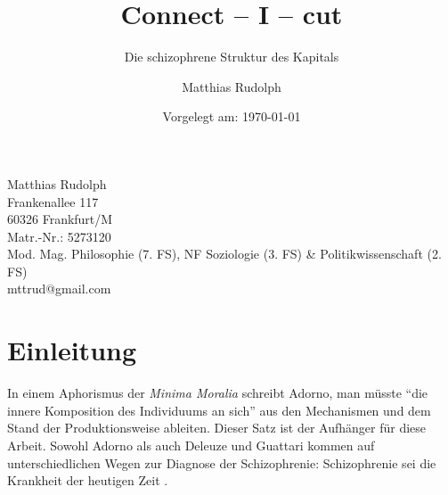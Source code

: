 \documentclass[12pt,
               DIV13,
               paper=a4,
               twoside=false,
               onehalfspacing,
               bibliography=totoc,
               toc=graduated,
               draft,
               ]{scrartcl}
\newcommand{\pc}[2]{\parencite[#1]{#2}}
\newcommand{\dg}{Deleuze und Guattari\xspace}
\begin{document}
\setcounter{page}{0}

\titlehead{Goethe-Universität Frankfurt am Main\\
Fachbereich Philosophie und Geschichtswissenschaften\\
Institut für Philosophie\\
Prof. Dr. Christoph Menke\\
Seminar: Demokratie und Kapitalismus\\
SoSe 2013\\
Modul: Mod. Mag. VM 3b}
\title{Connect -- I -- cut}
\subtitle{Die schizophrene Struktur des Kapitals}
\author{Matthias Rudolph}
\date{Vorgelegt am: \today}

\maketitle
\vfill

\noindent Matthias Rudolph\\
Frankenallee 117\\
60326 Frankfurt/M\\
Matr.-Nr.: 5273120\\
Mod. Mag. Philosophie (7. FS), NF Soziologie (3. FS) \& Politikwissenschaft (2. FS)\\ %
mttrud@gmail.com
\newpage

\tableofcontents
\newpage


\section{Einleitung}

%
%

In einem Aphorismus der \emph{Minima Moralia} \pc{}{min} schreibt
Adorno, man müsste "`die innere Komposition des Individuums an sich"'
\pc{261}{min} aus den Mechanismen und dem Stand der Produktionsweise
ableiten. Dieser Satz ist der Aufhänger für diese Arbeit. Sowohl
Adorno als auch \dg kommen auf unterschiedlichen Wegen zur Diagnose
der Schizophrenie: Schizophrenie sei die Krankheit der heutigen Zeit
\parencites[vgl.][263]{min}[28]{schizg}.
\end{document}
